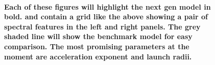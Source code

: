 \documentclass[preprint, a4paper, 11pt]{aastex}
\begin{document}
\begin{figure} %
\mbox{
\quad
{}   
}
\caption{
\bf{Each of these figures will highlight the next gen model in bold.
and contain a grid like the above showing a pair of spectral features in
the left and right panels. The grey shaded line will show the benchmark model
for easy comparison.  
The most promising parameters at the moment are acceleration exponent and launch radii.}
}
\label{halpha}
\end{figure} %
\end{document}
